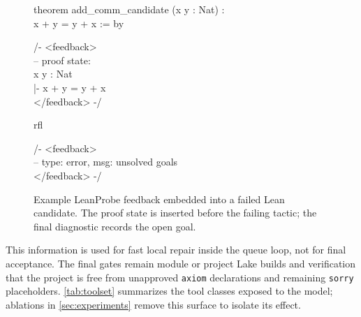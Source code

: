 \documentclass{article}
\begin{document}
\begin{figure}[H]
\centering
\begin{leanexamplebox}[title={LeanProbe feedback on a failed candidate}]
\textcolor{leanKeyword}{theorem} add\_comm\_candidate (x y : Nat) :\\
\hspace*{1.0em}x + y = y + x := by
\begin{leanfeedbackbox}
\textcolor{feedbackFrame}{/- \textless{}feedback\textgreater{}}\\
\textcolor{feedbackFrame}{-- proof state:}\\
x y : Nat\\
\textcolor{leanGoal}{|- x + y = y + x}\\
\textcolor{feedbackFrame}{\textless{}/feedback\textgreater{} -/}
\end{leanfeedbackbox}
\hspace*{1.0em}rfl
\begin{leanfeedbackbox}
\textcolor{feedbackFrame}{/- \textless{}feedback\textgreater{}}\\
\textcolor{leanError}{-- type: error, msg: unsolved goals}\\
\textcolor{feedbackFrame}{\textless{}/feedback\textgreater{} -/}
\end{leanfeedbackbox}
\end{leanexamplebox}
\caption{Example LeanProbe feedback embedded into a failed Lean candidate. The proof state is inserted before the failing tactic; the final diagnostic records the open goal.}
\label{fig:leanprobe-feedback}
\end{figure}
This information is used for fast local repair inside the queue loop, not for final acceptance.
The final gates remain module or project Lake builds and verification that the project is free from unapproved \texttt{axiom} declarations and remaining \texttt{sorry} placeholders.
\cref{tab:toolset} summarizes the tool classes exposed to the model; ablations in \cref{sec:experiments} remove this surface to isolate its effect.
\end{document}
